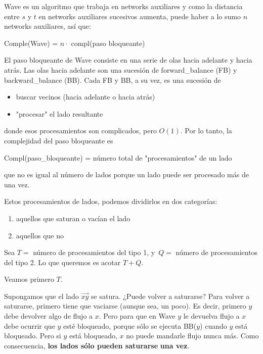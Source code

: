 \documentclass[10pt,a4paper]{article}
\begin{document}
Wave es un algoritmo que trabaja en networks auxiliares y como la distancia entre $s$ y $t$ en networks auxiliares sucesivos aumenta, puede haber a lo sumo $n$ networks auxiliares, así que:

\begin{center}
Comple(Wave) = $n \cdot$ compl(paso bloqueante)
\end{center}

El paso bloqueante de Wave consiste en una serie de olas hacia adelante y hacia atrás. Las olas hacia adelante son una sucesión de forward_balance (FB) y backward_balance (BB). Cada FB y BB, a su vez, es una sucesión de

\begin{itemize}

	\item buscar vecinos (hacia adelante o hacia atrás)
	\item "procesar" el lado resultante
\end{itemize}

donde esos procesamientos son complicados, pero $O(1)$. Por lo tanto, la complejidad del paso bloqueante es

\begin{center}
Compl(paso_bloqueante) = número total de "procesamientos" de un lado
\end{center}

que no es igual al número de lados porque un lado puede ser procesado más de una vez.

Estos procesamientos de lados, podemos dividirlos en dos categorías:

\begin{enumerate}

	\item aquellos que saturan o vacían el lado
	\item aquellos que no
\end{enumerate}

Sea $T =$ número de procesamientos del tipo 1, y $Q = $ número de procesamientos del tipo 2. Lo que queremos es acotar $T + Q$.

Veamos primero $T$.

Supongamos que el lado $\overrightarrow{xy}$ se satura. ¿Puede volver a saturarse? Para volver a saturarse, primero tiene que vaciarse (aunque sea, un poco). Es decir, primero $y$ debe devolver algo de flujo a $x$. Pero para que en Wave $y$ le devuelva flujo a $x$ debe ocurrir que $y$ esté bloqueado, porque sólo se ejecuta BB($y$) cuando $y$ está bloqueado. Pero si $y $ está bloqueado, $x$ no puede mandarle flujo nunca más. Como consecuencia, \textbf{los lados sólo pueden saturarse} \textbf{una vez}.
\end{document}
